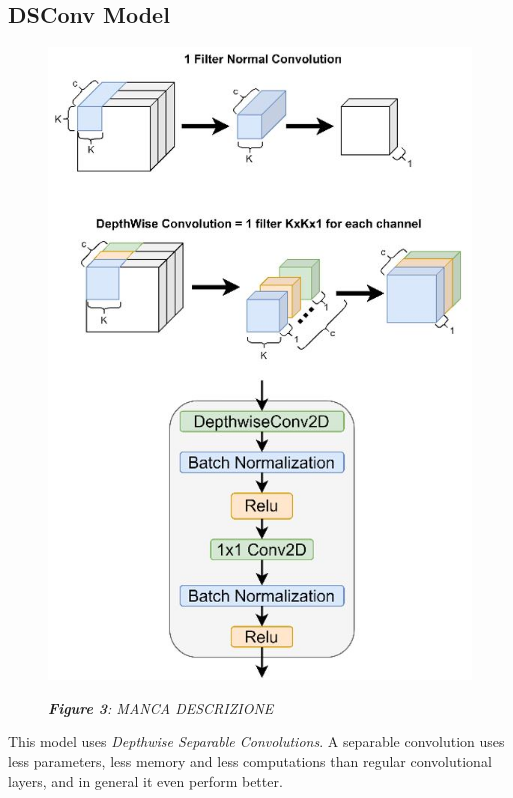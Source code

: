 \documentclass[conference]{IEEEtran}
\begin{document}
\subsection{DSConv Model}
\begin{figure}[t]
\centering
\includegraphics[scale=0.6]{confronto}

\begin{small}\textit{\textbf{Figure 3}: MANCA DESCRIZIONE}
\end{small}
\end{figure}

This model uses \textit{Depthwise Separable Convolutions}. A separable convolution uses less parameters, less memory and less computations than regular convolutional layers, and in general it even perform better.
\end{document}
